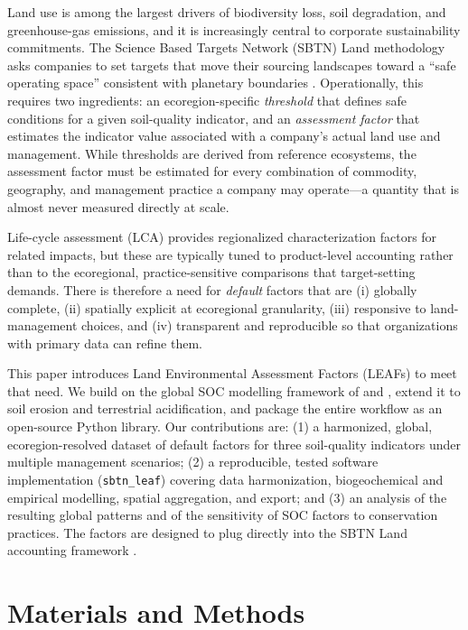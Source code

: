 \documentclass[11pt]{article}
\begin{document}
Land use is among the largest drivers of biodiversity loss, soil degradation, and
greenhouse-gas emissions, and it is increasingly central to corporate sustainability
commitments. The Science Based Targets Network (SBTN) Land methodology asks companies
to set targets that move their sourcing landscapes toward a ``safe operating space''
consistent with planetary boundaries \citep{rockstrom2009,sbtnland2025}. Operationally,
this requires two ingredients: an ecoregion-specific \emph{threshold} that defines safe
conditions for a given soil-quality indicator, and an \emph{assessment factor} that
estimates the indicator value associated with a company's actual land use and
management. While thresholds are derived from reference ecosystems, the assessment
factor must be estimated for every combination of commodity, geography, and management
practice a company may operate---a quantity that is almost never measured directly at
scale.

Life-cycle assessment (LCA) provides regionalized characterization factors for related
impacts, but these are typically tuned to product-level accounting rather than to the
ecoregional, practice-sensitive comparisons that target-setting demands. There is
therefore a need for \emph{default} factors that are (i) globally complete, (ii)
spatially explicit at ecoregional granularity, (iii) responsive to land-management
choices, and (iv) transparent and reproducible so that organizations with primary data
can refine them.

This paper introduces Land Environmental Assessment Factors (LEAFs) to meet that need.
We build on the global SOC modelling framework of \citet{morais2019} and
\citet{teixeira2021}, extend it to soil erosion and terrestrial acidification, and
package the entire workflow as an open-source Python library. Our contributions are: (1)
a harmonized, global, ecoregion-resolved dataset of default factors for three
soil-quality indicators under multiple management scenarios; (2) a reproducible,
tested software implementation (\texttt{sbtn\_leaf}) covering data harmonization,
biogeochemical and empirical modelling, spatial aggregation, and export; and (3) an
analysis of the resulting global patterns and of the sensitivity of SOC factors to
conservation practices. The factors are designed to plug directly into the SBTN Land
accounting framework \citep{sbtnagile2025}.

\section{Materials and Methods}
\label{sec:methods}
\end{document}
